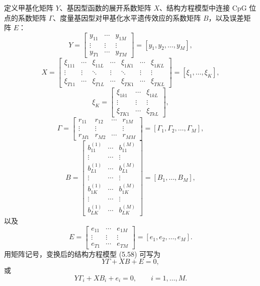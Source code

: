 定义甲基化矩阵 $Y$、基因型函数的展开系数矩阵 $X$、结构方程模型中连接 CpG 位点的系数矩阵 $\Gamma$、度量基因型对甲基化水平遗传效应的系数矩阵 $B$，以及误差矩阵 $E$：
\[
Y=\begin{bmatrix}y_{11}&\cdots&y_{1M}\\\vdots&\vdots&\vdots\\y_{T1}&\cdots&y_{TM}\end{bmatrix}
=[y_1,y_2,\ldots,y_M],
\]
\[
X=\begin{bmatrix}
\xi_{111}&\cdots&\xi_{11L}&\cdots&\xi_{1K1}&\cdots&\xi_{1KL}\\
\vdots&\vdots&\ddots&\vdots&\ddots&\vdots&\vdots\\
\xi_{T11}&\cdots&\xi_{T1L}&\cdots&\xi_{TK1}&\cdots&\xi_{TKL}
\end{bmatrix}=[\xi_1,\ldots,\xi_K],
\]
\[
\xi_K=\begin{bmatrix}\xi_{1k1}&\cdots&\xi_{1kL}\\\vdots&\vdots&\vdots\\\xi_{TK1}&\cdots&\xi_{TkL}\end{bmatrix},
\]
\[
\Gamma=\begin{bmatrix}r_{11}&r_{12}&\cdots&r_{1M}\\\vdots&\vdots&&\vdots\\r_{M1}&r_{M2}&\cdots&r_{MM}\end{bmatrix}
=[\Gamma_1,\Gamma_2,\ldots,\Gamma_M],
\]
\[
B=\begin{bmatrix}
b_{11}^{(1)}&\cdots&b_{11}^{(M)}\\
\vdots&\cdots&\vdots\\
b_{L1}^{(1)}&\cdots&b_{L1}^{(M)}\\
\vdots&\cdots&\vdots\\
b_{1K}^{(1)}&\cdots&b_{1K}^{(M)}\\
\vdots&\cdots&\vdots\\
b_{LK}^{(1)}&\cdots&b_{LK}^{(M)}
\end{bmatrix}=[B_1,\ldots,B_M],
\]
以及
\[
E=\begin{bmatrix}e_{11}&\cdots&e_{1M}\\\vdots&\vdots&\vdots\\e_{T1}&\cdots&e_{TM}\end{bmatrix}
=[e_1,e_2,\ldots,e_M].
\]
用矩阵记号，变换后的结构方程模型 (5.58) 可写为
\begin{equation}
Y\Gamma+XB+E=0,
\tag{5.60}
\end{equation}
或
\begin{equation}
Y\Gamma_i+XB_i+e_i=0,\qquad i=1,\ldots,M.
\tag{5.61}
\end{equation}

